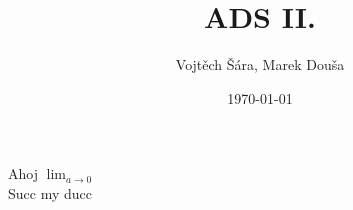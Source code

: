 \documentclass{article}
\title{ADS II.}
\date{\today}
\author{Vojtěch Šára, Marek Douša}
\begin{document}
\maketitle
Ahoj $\lim_{a \rightarrow 0}$ \\
Succ my ducc
\end{document}
